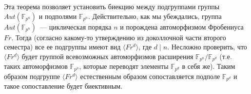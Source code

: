 \follow Эта теорема позволяет установить биекцию между подгруппами группы $Aut(\mathbb{F}_{p^n})$ и подполями $\mathbb{F}_{p^n}$.
Действительно, как мы убеждались, группа $Aut(\mathbb{F}_{p^n})$~--- циклическая порядка $n$ и порождена автоморфизмом Фробениуса $Fr$.
Тогда (согласно какому-то утверждению из доколлочной части второго семестра) все ее подгруппы имеют вид $\langle Fr^d\rangle $, где $d \mid n$.
Несложно проверить, что $\langle Fr^d\rangle $ будет группой всевозможных автоморфизмов расширения $\mathbb{F}_{p^n} / \mathbb{F}_{p^d}$ (т.е. таких автоморфизмов $\mathbb{F}_{p^n}$, которые переводят элементы $\mathbb{F}_{p^d}$ в себя же).
Таким образом подгруппе $\langle Fr^d \rangle$ естественным образом сопоставляется подполе $\mathbb{F}_{p^d}$ и такое сопоставление будет биективным.
